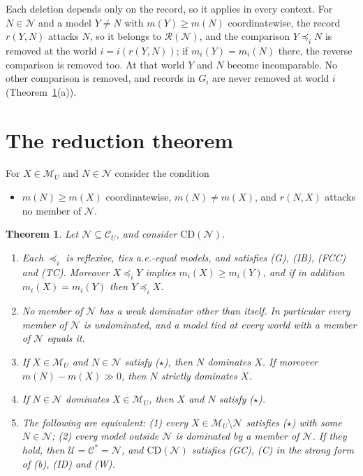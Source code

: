 \documentclass[11pt]{article}
\newcommand{\M}{\mathcal{M}}
\newcommand{\CC}{\mathcal{C}}
\newcommand{\UU}{\mathcal{U}}
\newcommand{\NN}{\mathcal{N}}
\newcommand{\RR}{\mathcal{R}}
\newcommand{\CD}{\mathrm{CD}}
\theoremstyle{plain}
\newtheorem{theorem}{Theorem}[section]
\theoremstyle{definition}
\theoremstyle{remark}
\begin{document}
Each deletion depends only on the record, so it applies in every context. For
$N\in\NN$ and a model $Y\ne N$ with $m(Y)\ge m(N)$ coordinatewise, the record
$r(Y,N)$ attacks $N$, so it belongs to $\RR(\NN)$, and the comparison $Y\preceq_iN$ is
removed at the world $i=i(r(Y,N))$; if $m_i(Y)=m_i(N)$ there, the reverse comparison is
removed too. At that world $Y$ and $N$ become incomparable. No other comparison is
removed, and records in $G_i$ are never removed at world $i$
(Theorem~\ref{thm:reduction}(a)).

\section{The reduction theorem}\label{sec:reduction}

For $X\in\M_U$ and $N\in\NN$ consider the condition
\begin{itemize}
  \item[($\star$)] $m(N)\ge m(X)$ coordinatewise, $m(N)\ne m(X)$, and $r(N,X)$ attacks
  no member of $\NN$.
\end{itemize}

\begin{theorem}\label{thm:reduction}
Let $\NN\subseteq\CC_U$, and consider $\CD(\NN)$.
\begin{enumerate}[label=(\alph*)]
  \item Each $\preceq_i$ is reflexive, ties a.e.-equal models, and satisfies (G), (IB),
  (FCC) and (TC). Moreover $X\preceq_iY$ implies $m_i(X)\ge m_i(Y)$, and if in addition
  $m_i(X)=m_i(Y)$ then $Y\preceq_iX$.
  \item No member of $\NN$ has a weak dominator other than itself. In particular every
  member of $\NN$ is undominated, and a model tied at every world with a member of $\NN$
  equals it.
  \item If $X\in\M_U$ and $N\in\NN$ satisfy ($\star$), then $N$ dominates $X$. If moreover
  $m(N)-m(X)\gg0$, then $N$ strictly dominates $X$.
  \item If $N\in\NN$ dominates $X\in\M_U$, then $X$ and $N$ satisfy ($\star$).
  \item The following are equivalent: (1) every $X\in\M_U\setminus\NN$ satisfies
  ($\star$) with some $N\in\NN$; (2) every model outside $\NN$ is dominated by a member of
  $\NN$. If they hold, then $\UU=\CC^\ast=\NN$, and $\CD(\NN)$ satisfies (GC), (C) in the
  strong form of (b), (ID) and (W).
\end{enumerate}
\end{theorem}
\end{document}
